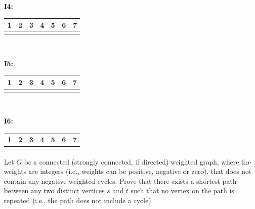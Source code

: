 \documentclass[12pt]{exam}
\newcommand{\stars}[1]{%
    \foreach \n in {1,...,#1}{%
        $\filledstar$%
    }%
}
\begin{document}
\begin{questions}
    {{\bf I4:}
    \par{
        \begin{tabular}{|c|c|c|c|c|c|c|}
            \multicolumn{1}{c}{1} & \multicolumn{1}{c}{2} &
            \multicolumn{1}{c}{3} & \multicolumn{1}{c}{4} &
            \multicolumn{1}{c}{5} & \multicolumn{1}{c}{6} &
            \multicolumn{1}{c}{7}
            \\ \hline
                                  &                       &   &  &  &  & \\
            \hline
        \end{tabular}}}\\

    {{\bf I5:}
    \par{
        \begin{tabular}{|c|c|c|c|c|c|c|}
            \multicolumn{1}{c}{1} & \multicolumn{1}{c}{2} &
            \multicolumn{1}{c}{3} & \multicolumn{1}{c}{4} &
            \multicolumn{1}{c}{5} & \multicolumn{1}{c}{6} &
            \multicolumn{1}{c}{7}
            \\ \hline
                                  &                       &   &  &  &  & \\
            \hline
        \end{tabular}}}\\

    {{\bf I6:}
    \par{
        \begin{tabular}{|c|c|c|c|c|c|c|}
            \multicolumn{1}{c}{1} & \multicolumn{1}{c}{2} &
            \multicolumn{1}{c}{3} & \multicolumn{1}{c}{4} &
            \multicolumn{1}{c}{5} & \multicolumn{1}{c}{6} &
            \multicolumn{1}{c}{7}
            \\ \hline
                                  &                       &   &  &  &  & \\
            \hline
        \end{tabular}}}

    \clearpage


    \question[25] [W6, \stars{4}] Let $G$ be a connected (strongly connected, if directed) weighted graph, where the weights are integers (i.e., weights can be positive, negative or zero), that does not contain any negative weighted cycles. Prove that there exists a shortest path between any two distinct vertices $s$ and $t$ such that no vertex on the path is repeated (i.e., the path does not include a cycle).

    \clearpage


\end{questions}
\end{document}
